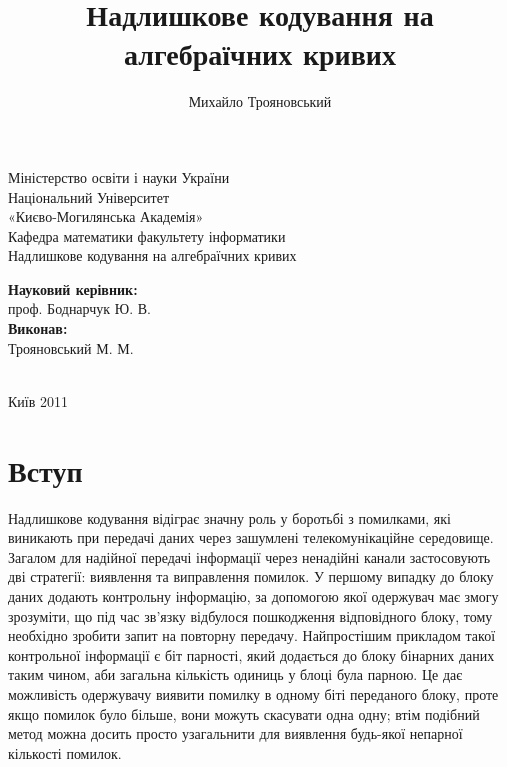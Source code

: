 \documentclass[a4paper,12pt,oneside]{article}
\title{Надлишкове кодування на алгебраїчних кривих}
\author{Михайло Трояновський}
\begin{document}
\begin{titlepage}
\begin{center}
    Міністерство освіти і науки України\\
Національний Університет\\ «Києво-Могилянська Академія»\\
        Кафедра математики факультету інформатики\\
        \vskip 3cm
                               \vskip 1cm
{\Large
        Надлишкове кодування на алгебраїчних кривих
}
\vskip 1cm
\textwidth
\begin{minipage}{0.5\textwidth}
        \textbf{Науковий керівник:}\\
        проф. Боднарчук Ю. В.\\
\textbf{Виконав:}\\
        Трояновський М. М.\\
        \\
        \end{minipage}
        \vfill
        Київ 2011
        \end{center}
        \end{titlepage}


\tableofcontents
\pagebreak

\section*{Вступ}
Надлишкове кодування відіграє значну роль у боротьбі з помилками, які виникають при передачі даних через зашумлені телекомунікаційне середовище. 
Загалом для надійної передачі інформації через ненадійні канали застосовують дві стратегії: виявлення та виправлення помилок. 
У першому випадку до блоку даних додають контрольну інформацію, за допомогою якої одержувач має змогу зрозуміти, 
що під час зв'язку відбулося пошкодження відповідного блоку, тому необхідно зробити запит на повторну передачу. 
Найпростішим прикладом такої контрольної інформації є біт парності, який додається до блоку бінарних даних таким чином, аби загальна кількість одиниць у блоці була парною. 
Це дає можливість одержувачу виявити помилку в одному біті переданого блоку, проте якщо помилок було більше, вони можуть скасувати одна одну; 
втім подібний метод можна досить просто узагальнити для виявлення будь-якої непарної кількості помилок.
\end{document}
